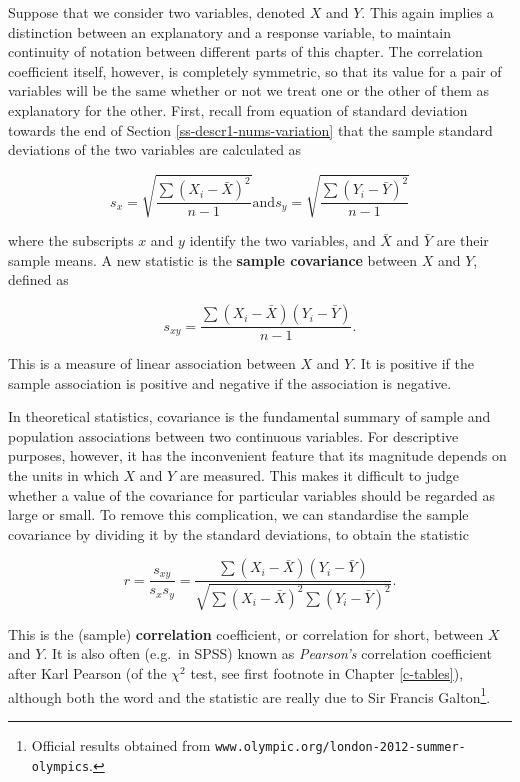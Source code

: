 \documentclass[11pt,a4paper,openany]{book}
\let\rmarkdownfootnote\footnote%
\def\footnote{\protect\rmarkdownfootnote}
\begin{document}
Suppose that we consider two variables, denoted \(X\) and \(Y\). This
again implies a distinction between an explanatory and a response
variable, to maintain continuity of notation between different parts of
this chapter. The correlation coefficient itself, however, is completely
symmetric, so that its value for a pair of variables will be the same
whether or not we treat one or the other of them as explanatory for the
other. First, recall from equation of standard deviation towards the end
of Section \ref{ss-descr1-nums-variation} that the sample standard
deviations of the two variables are calculated as

\begin{equation}s_{x} = \sqrt{\frac{\sum(X_{i}-\bar{X})^{2}}{n-1}}
\text{and}
s_{y} = \sqrt{\frac{\sum (Y_{i}-\bar{Y})^{2}}{n-1}}
\label{eq:sdyx}\end{equation}

where the subscripts \(x\) and \(y\) identify the two variables, and
\(\bar{X}\) and \(\bar{Y}\) are their sample means. A new statistic is
the \textbf{sample covariance} between \(X\) and \(Y\), defined as

\begin{equation}s_{xy} = \frac{\sum (X_{i}-\bar{X})(Y_{i}-\bar{Y})}{n-1}.
\label{eq:sxy}\end{equation}

This is a measure of linear association between \(X\) and \(Y\). It is
positive if the sample association is positive and negative if the
association is negative.

In theoretical statistics, covariance is the fundamental summary of
sample and population associations between two continuous variables. For
descriptive purposes, however, it has the inconvenient feature that its
magnitude depends on the units in which \(X\) and \(Y\) are measured.
This makes it difficult to judge whether a value of the covariance for
particular variables should be regarded as large or small. To remove
this complication, we can standardise the sample covariance by dividing
it by the standard deviations, to obtain the statistic

\begin{equation}r=\frac{s_{xy}}{s_{x}s_{y}} =
\frac
{
\sum (X_{i}-\bar{X})(Y_{i}-\bar{Y})
}{
\sqrt{
\sum\left(X_{i}-\bar{X}\right)^{2}
\sum\left(Y_{i}-\bar{Y}\right)^{2}}
}.
\label{eq:corr}\end{equation}

This is the (sample) \textbf{correlation} coefficient, or correlation
for short, between \(X\) and \(Y\). It is also often (e.g.~in SPSS)
known as \emph{Pearson's} correlation coefficient after Karl Pearson (of
the \(\chi^{2}\) test, see first footnote in Chapter \ref{c-tables}),
although both the word and the statistic are really due to Sir Francis
Galton\footnote{Official results obtained from
  \texttt{www.olympic.org/london-2012-summer-olympics}.}.
\end{document}
